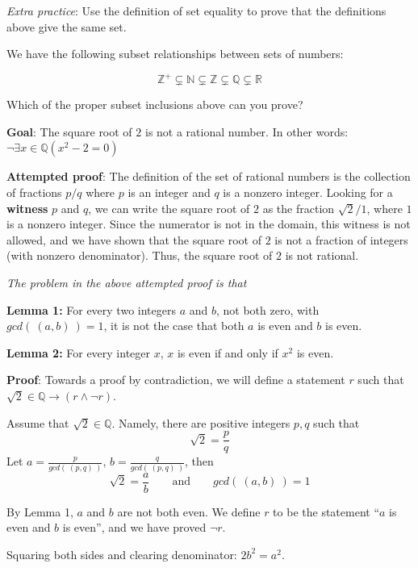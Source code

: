 \documentclass[12pt, oneside]{article}
\begin{document}
{\it Extra practice}: Use the definition of set equality to prove that the definitions above  give the same set.

 

We have the following subset relationships between sets of numbers:

\[
    \mathbb{Z}^{+} \subsetneq \mathbb{N} \subsetneq \mathbb{Z} \subsetneq \mathbb{Q} \subsetneq \mathbb{R}
\]


Which of the proper subset inclusions above can you prove?

\vspace{50pt} 

{\bf Goal}:  The square root of $2$ is not a rational number.  In other words: $\neg \exists x \in \mathbb{Q} ( x^2 -  2 = 0)$

{\bf Attempted proof}: The definition of the set of rational numbers is the collection of fractions $p/q$ where $p$ is an integer and $q$ is a nonzero integer. Looking for a {\bf witness} $p$ and $q$, we can write the square root of $2$ as the fraction 
$\sqrt{2 }/1$, where $1$ is a nonzero integer. Since the numerator is not in the domain, this witness is not allowed, and we have shown that the square root of $2$ is not a fraction of integers (with nonzero denominator). Thus, the square root of $2$ is not rational.


{\it The problem in the above attempted proof is that} \underline{\phantom{it only considers one candidate witness
and does not prove that no witnesses exist.}}


{\bf Lemma 1:} For every two integers $a$ and  $b$, not both zero, with  $gcd(~(a,b)~) = 1$, it is not the case that both $a$
is  even and $b$ is even.


{\bf Lemma 2:} For every integer  $x$, $x$ is  even if and only if $x^2$  is even.


{\bf Proof}: Towards a proof by contradiction, we will define a statement 
$r$ such that $\sqrt{2} \in \mathbb{Q} \to (r \land \lnot r)$. 

Assume that $\sqrt{2} \in \mathbb{Q}$. Namely, there are positive integers
$p, q$ such that 
\[
    \sqrt{2} = \frac{p}{q}
\]
Let $a= \frac{p}{gcd( ~(p,q)~)}$, $b = \frac{q}{gcd(~(p,q)~)}$, then 
\[
    \sqrt{2} = \frac{a}{b} \qquad \text{and} \qquad gcd(~(a,b)~) = 1
\]

By Lemma 1, $a$ and $b$ are not both even. We define $r$ to be the 
statement ``$a$ is even and $b$ is even'', and we have proved $\lnot r$.

Squaring both sides and clearing denominator: $2b^2 = a^2$.
\end{document}
